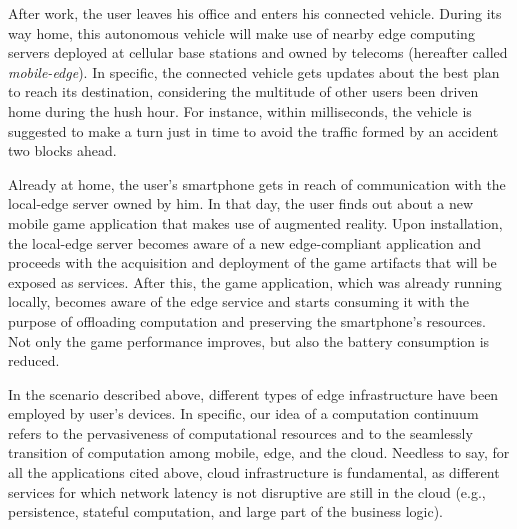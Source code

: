 After work, the user leaves his office and enters his connected vehicle. During its way home, this autonomous vehicle will make use of nearby edge computing servers deployed at cellular base stations and owned by telecoms (hereafter called \textit{mobile-edge}). In specific, the connected vehicle gets updates about the best plan to reach its destination, considering the multitude of other users been driven home during the hush hour. For instance, within milliseconds, the vehicle is suggested to make a turn just in time to avoid the traffic formed by an accident two blocks ahead. 

Already at home, the user's smartphone gets in reach of communication with the local-edge server owned by him. In that day, the user finds out about a new mobile game application that makes use of augmented reality. Upon installation, the local-edge server becomes aware of a new edge-compliant application and proceeds with the acquisition and deployment of the game artifacts that will be exposed as services. After this, the game application, which was already running locally, becomes aware of the edge service and starts consuming it with the purpose of offloading computation and preserving the smartphone's resources. Not only the game performance improves, but also the battery consumption is reduced.  

In the scenario described above, different types of edge infrastructure have been employed by user's devices. In specific, our idea of a computation continuum refers to the pervasiveness of computational resources and to the seamlessly transition of computation among mobile, edge, and the cloud. Needless to say, for all the applications cited above, cloud infrastructure is  fundamental, as different services for which network latency is not disruptive are still in the cloud (e.g., persistence, stateful computation, and large part of the business logic).